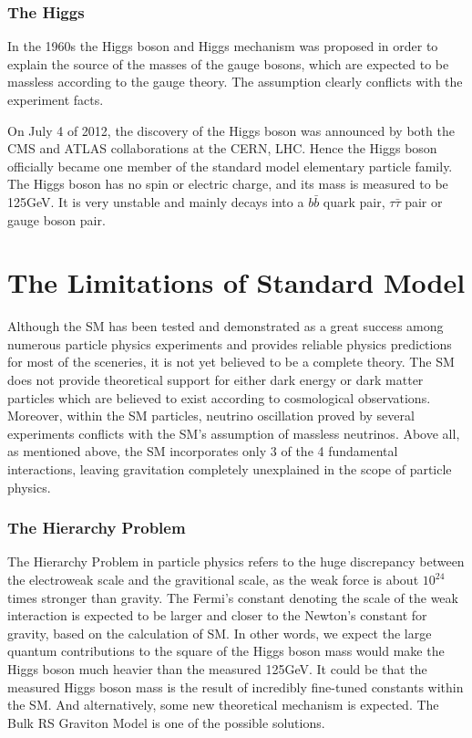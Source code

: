 \subsubsection{The Higgs}
In the 1960s the Higgs boson and Higgs mechanism was proposed in order to explain the source of the masses of the gauge bosons\cite{higgstheory1,higgstheory2,higgstheory3}, which are expected to be massless according to the gauge theory. The assumption clearly conflicts with the experiment facts. 

\vspace{0.3cm}
On July 4 of 2012, the discovery of the Higgs boson was announced by both the CMS and ATLAS collaborations at the CERN, LHC\cite{higgsdiscover1,higgsdiscover2}. Hence the Higgs boson officially became one member of the standard model elementary particle family. The Higgs boson has no spin or electric charge, and its mass is measured to be 125GeV. It is very unstable and mainly decays into a $b\bar{b}$ quark pair, $\tau\bar{\tau}$ pair or gauge boson pair.

\section{The Limitations of Standard Model}
Although the SM has been tested and demonstrated as a great success among numerous particle physics experiments and provides reliable physics predictions for most of the sceneries, it is not yet believed to be a complete theory. The SM does not provide theoretical support for either dark energy or dark matter particles which are believed to exist according to cosmological observations. Moreover, within the SM particles, neutrino oscillation proved by several experiments conflicts with the SM's assumption of massless neutrinos. Above all, as mentioned above, the SM incorporates only 3 of the 4 fundamental interactions, leaving gravitation completely unexplained in the scope of particle physics.
\subsubsection{The Hierarchy Problem}
The Hierarchy Problem in particle physics refers to the huge discrepancy between the electroweak scale and the gravitional scale, as the weak force is about $10^{24}$ times stronger than gravity. The Fermi's constant denoting the scale of the weak interaction is expected to be larger and closer to the Newton's constant for gravity, based on the calculation of SM. In other words, we expect the large quantum contributions to the square of the Higgs boson mass would make the Higgs boson much heavier than the measured 125GeV. It could be that the measured Higgs boson mass is the result of incredibly fine-tuned constants within the SM. And alternatively, some new theoretical mechanism is expected. The Bulk RS Graviton Model is one of the possible solutions.

